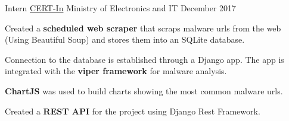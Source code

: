 

\begin{cventries}

  \jobs
    {Intern} %
    {\href{http://www.cert-in.org.in/}{CERT-In}} %
    {Ministry of Electronics and IT} %
    {December 2017} %
    {
      \begin{cvitems} %
        \item {Created a \textbf{scheduled web scraper} that scraps malware urls from the web (Using Beautiful Soup) and stores them into an SQLite database.}
        \item {Connection to the database is established through a Django app. The app is integrated with the \textbf{viper framework} for malware analysis. }
        \item {\textbf{ChartJS} was used to build charts showing the most common malware urls.}
        \item {Created a \textbf{REST API} for the project using Django Rest Framework.}
      \end{cvitems}
    }



\end{cventries}
